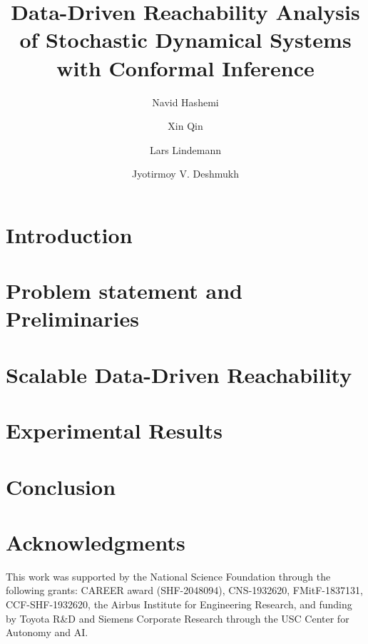 \documentclass[11pt]{article}
\begin{document}
\newtheorem{theorem}{Theorem}
\newtheorem{definition}{Definition}
\newtheorem{lemma}{Lemma}


\title{Data-Driven Reachability Analysis of Stochastic Dynamical Systems with Conformal Inference }


\author[1]{Navid Hashemi}
\author[1]{Xin Qin}
\author[1]{Lars Lindemann}
\author[1]{Jyotirmoy V. Deshmukh}


\maketitle





\section{Introduction}


\section{Problem statement and Preliminaries}
\label{sec:prelim}



\section{Scalable Data-Driven Reachability}
\label{sec:verification}


\section{Experimental Results}
\label{sec:results}

 
\section{Conclusion }
\label{sec:conclusion}


\section*{Acknowledgments}
This work was supported by the National Science Foundation through the following grants: CAREER award (SHF-2048094), CNS-1932620,  FMitF-1837131, CCF-SHF-1932620, the Airbus Institute for Engineering Research, and funding by Toyota R\&D and Siemens Corporate Research through the USC Center for Autonomy and AI.
\end{document}
